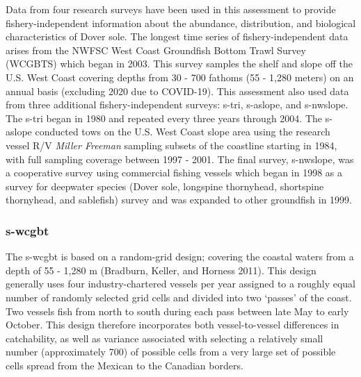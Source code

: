 \documentclass[11pt,
  english,
  a4paper,
]{article}
\begin{document}

Data from four research surveys have been used in this assessment to provide fishery-independent information about the abundance, distribution, and biological characteristics of Dover sole. The longest time series of fishery-independent data arises from the NWFSC West Coast Groundfish Bottom Trawl Survey (WCGBTS) which began in 2003. This survey samples the shelf and slope off the U.S. West Coast covering depths from 30 - 700 fathoms (55 - 1,280 meters) on an annual basis (excluding 2020 due to COVID-19). This assessment also used data from three additional fishery-independent surveys: \gls{s-tri}, \gls{s-aslope}, and \gls{s-nwslope}. The \gls{s-tri} began in 1980 and repeated every three years through 2004. The \gls{s-aslope} conducted tows on the U.S. West Coast slope area using the research vessel R/V \emph{Miller Freeman} sampling subsets of the coastline starting in 1984, with full sampling coverage between 1997 - 2001. The final survey, \gls{s-nwslope}, was a cooperative survey using commercial fishing vessels which began in 1998 as a survey for deepwater species (Dover sole, longspine thornyhead, shortspine thornyhead, and sablefish) survey and was expanded to other groundfish in 1999.

\leavevmode\tagmcend\tagstructend\par


\hypertarget{nwfsc-wcgbt}{%
\subsubsection{\texorpdfstring{\acrlong{s-wcgbt}}{}}\label{nwfsc-wcgbt}}

\leavevmode\tagmcend\tagstructend


The \gls{s-wcgbt} is based on a random-grid design; covering the coastal waters from a depth of 55 - 1,280 m {(Bradburn, Keller, and Horness 2011)\leavevmode\tagmcend\tagstructend}. This design generally uses four industry-chartered vessels per year assigned to a roughly equal number of randomly selected grid cells and divided into two `passes' of the coast. Two vessels fish from north to south during each pass between late May to early October. This design therefore incorporates both vessel-to-vessel differences in catchability, as well as variance associated with selecting a relatively small number (approximately 700) of possible cells from a very large set of possible cells spread from the Mexican to the Canadian borders.
\end{document}
